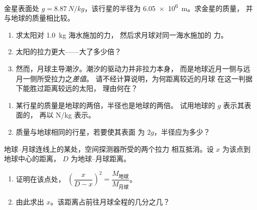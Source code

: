 \begin{exercise}[$\star\star$]\label{exo:g10:universal-gravitation:9}
金星表面处 $g = \qty{8.87}{N/kg}$，该行星的半径为
\qty{6.05e6}{m}。求金星的质量，
并与地球的质量相比较。
\end{exercise}

\begin{exercise}[$\star\star$]\label{exo:g10:universal-gravitation:10}
\begin{enumerate}
  \item 求太阳对 \qty{1.0}{kg} 海水施加的力，
        然后求月球对同一海水施加的
        力。
  \item 太阳的拉力更大——大了多少倍？
  \item 然而，月球主导潮汐。潮汐的驱动力并非拉力本身，
        而是地球近月一侧与远月一侧所受拉力之\emph{差值}。
        请不经计算说明，为何距离较近的月球
        在这一判据下能胜过距离较远的太阳，
        理由何在？
\end{enumerate}
\end{exercise}

\begin{exercise}[$\star\star$]\label{exo:g10:universal-gravitation:11}
\begin{enumerate}
  \item 某行星的质量是地球的两倍，半径也是地球的两倍。
        试用地球的 $g$ 表示其表面的，
        再以 \unit{N/kg} 表示。
  \item 质量与地球相同的行星，若要使其表面
        为 $2g$，半径应为多少？
\end{enumerate}
\end{exercise}

\begin{exercise}[$\star\star\star$]\label{exo:g10:universal-gravitation:12}
地球–月球连线上的某处，空间探测器所受的两个拉力
相互抵消。设 $x$ 为该点到地球中心的距离，
$D$ 为地球–月球距离。
\begin{enumerate}
  \item 证明在该点处，
        $\left(\dfrac{x}{D - x}\right)^{2}
        = \dfrac{M_{\text{地球}}}{M_{\text{月球}}}$。
  \item 由此求出 $x$。该距离占前往月球全程的几分之几？
\end{enumerate}
\end{exercise}

